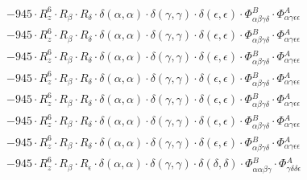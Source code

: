 \documentclass{article}
\begin{document}
\begin{subequations}
\begin{gather}
\begin{array}{c}
 \\[0.2em] 		 - 945 \cdot R_{z}^{6} \cdot R_{\beta{}} \cdot R_{\delta{}} \cdot \delta{}\left(\alpha{}, \alpha{}\right) \cdot \delta{}\left(\gamma{}, \gamma{}\right) \cdot \delta{}\left(\epsilon{}, \epsilon{}\right) \cdot \Phi{}^{B}_{\alpha{}\beta{}\gamma{}\delta{}} \cdot \Phi{}^{A}_{\alpha{}\gamma{}\epsilon{}\epsilon{}} 
 \\[0.2em] 		 - 945 \cdot R_{z}^{6} \cdot R_{\beta{}} \cdot R_{\delta{}} \cdot \delta{}\left(\alpha{}, \alpha{}\right) \cdot \delta{}\left(\gamma{}, \gamma{}\right) \cdot \delta{}\left(\epsilon{}, \epsilon{}\right) \cdot \Phi{}^{B}_{\alpha{}\beta{}\gamma{}\delta{}} \cdot \Phi{}^{A}_{\alpha{}\gamma{}\epsilon{}\epsilon{}} 
 \\[0.2em] 		 - 945 \cdot R_{z}^{6} \cdot R_{\beta{}} \cdot R_{\delta{}} \cdot \delta{}\left(\alpha{}, \alpha{}\right) \cdot \delta{}\left(\gamma{}, \gamma{}\right) \cdot \delta{}\left(\epsilon{}, \epsilon{}\right) \cdot \Phi{}^{B}_{\alpha{}\beta{}\gamma{}\delta{}} \cdot \Phi{}^{A}_{\alpha{}\gamma{}\epsilon{}\epsilon{}} 
 \\[0.2em] 		 - 945 \cdot R_{z}^{6} \cdot R_{\beta{}} \cdot R_{\delta{}} \cdot \delta{}\left(\alpha{}, \alpha{}\right) \cdot \delta{}\left(\gamma{}, \gamma{}\right) \cdot \delta{}\left(\epsilon{}, \epsilon{}\right) \cdot \Phi{}^{B}_{\alpha{}\beta{}\gamma{}\delta{}} \cdot \Phi{}^{A}_{\alpha{}\gamma{}\epsilon{}\epsilon{}} 
 \\[0.2em] 		 - 945 \cdot R_{z}^{6} \cdot R_{\beta{}} \cdot R_{\delta{}} \cdot \delta{}\left(\alpha{}, \alpha{}\right) \cdot \delta{}\left(\gamma{}, \gamma{}\right) \cdot \delta{}\left(\epsilon{}, \epsilon{}\right) \cdot \Phi{}^{B}_{\alpha{}\beta{}\gamma{}\delta{}} \cdot \Phi{}^{A}_{\alpha{}\gamma{}\epsilon{}\epsilon{}} 
 \\[0.2em] 		 - 945 \cdot R_{z}^{6} \cdot R_{\beta{}} \cdot R_{\delta{}} \cdot \delta{}\left(\alpha{}, \alpha{}\right) \cdot \delta{}\left(\gamma{}, \gamma{}\right) \cdot \delta{}\left(\epsilon{}, \epsilon{}\right) \cdot \Phi{}^{B}_{\alpha{}\beta{}\gamma{}\delta{}} \cdot \Phi{}^{A}_{\alpha{}\gamma{}\epsilon{}\epsilon{}} 
 \\[0.2em] 		 - 945 \cdot R_{z}^{6} \cdot R_{\beta{}} \cdot R_{\delta{}} \cdot \delta{}\left(\alpha{}, \alpha{}\right) \cdot \delta{}\left(\gamma{}, \gamma{}\right) \cdot \delta{}\left(\epsilon{}, \epsilon{}\right) \cdot \Phi{}^{B}_{\alpha{}\beta{}\gamma{}\delta{}} \cdot \Phi{}^{A}_{\alpha{}\gamma{}\epsilon{}\epsilon{}} 
 \\[0.2em] 		 - 945 \cdot R_{z}^{6} \cdot R_{\beta{}} \cdot R_{\epsilon{}} \cdot \delta{}\left(\alpha{}, \alpha{}\right) \cdot \delta{}\left(\gamma{}, \gamma{}\right) \cdot \delta{}\left(\delta{}, \delta{}\right) \cdot \Phi{}^{B}_{\alpha{}\alpha{}\beta{}\gamma{}} \cdot \Phi{}^{A}_{\gamma{}\delta{}\delta{}\epsilon{}} 

\end{array}
\end{gather}
\end{subequations}
\end{document}
